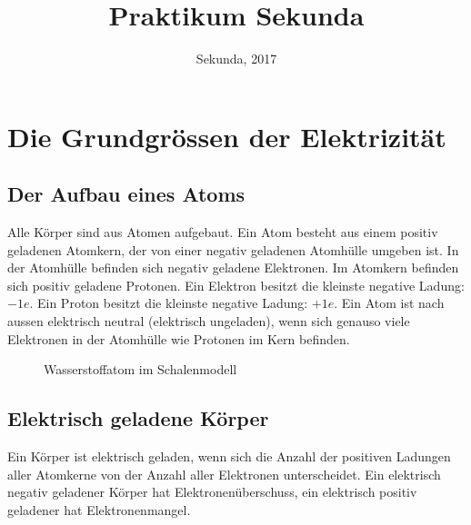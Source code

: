 \documentclass[11pt,twoside=false,open=any]{scrbook}
\begin{document}
\title{Praktikum Sekunda}

\publishers{Online verfügbar unter \href{https://goo.gl/6QeQWj}{goo.gl/6QeQWj}}
\date{Sekunda, 2017}

\begingroup
 \makeatletter
 \@titlepagetrue
 \maketitle
\endgroup
\newpage

\tableofcontents
\newpage
\chapter{Die Grundgrössen der Elektrizität} %
\section{Der Aufbau eines Atoms}
Alle Körper sind aus Atomen aufgebaut. Ein Atom besteht aus einem positiv geladenen Atomkern, der von einer negativ geladenen Atomhülle umgeben ist. In der Atomhülle befinden sich negativ geladene Elektronen. Im Atomkern befinden sich positiv geladene Protonen. Ein Elektron besitzt die kleinste negative Ladung: $-1e$. Ein Proton besitzt die kleinste negative Ladung: $+1e$. Ein Atom ist nach aussen elektrisch neutral (elektrisch ungeladen), wenn sich genauso viele Elektronen in der Atomhülle wie Protonen im Kern befinden.

\begin{figure}[h]
\centering
{}
\caption{Wasserstoffatom im Schalenmodell}
\label{fig:wasserstoffatom}
\end{figure}

\section{Elektrisch geladene Körper}
Ein Körper ist elektrisch geladen, wenn sich die Anzahl der positiven Ladungen aller Atomkerne von der Anzahl aller Elektronen unterscheidet. Ein elektrisch negativ geladener Körper hat Elektronenüberschuss, ein elektrisch positiv geladener hat Elektronenmangel.
\end{document}
